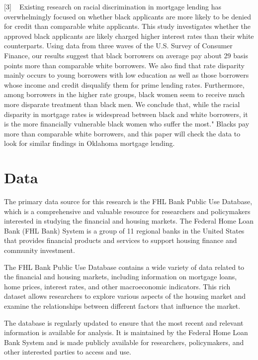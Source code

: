\documentclass[12pt,english]{article}
\begin{document}
[3] ~\cite{Cheng2014RacialDI} Existing research on racial discrimination in mortgage lending has overwhelmingly focused on whether black applicants are more likely to be denied for credit than comparable white applicants. This study investigates whether the approved black applicants are likely charged higher interest rates than their white counterparts. Using data from three waves of the U.S. Survey of Consumer Finance, our results suggest that black borrowers on average pay about 29 basis points more than comparable white borrowers. We also find that rate disparity mainly occurs to young borrowers with low education as well as those borrowers whose income and credit disqualify them for prime lending rates. Furthermore, among borrowers in the higher rate groups, black women seem to receive much more disparate treatment than black men. We conclude that, while the racial disparity in mortgage rates is widespread between black and white borrowers, it is the more financially vulnerable black women who suffer the most." Blacks pay more than comparable white borrowers, and this paper will check the data to look for similar findings in Oklahoma mortgage lending. 

\section{Data}\label{sec:data}
The primary data source for this research is the FHL Bank Public Use Database, which is a comprehensive and valuable resource for researchers and policymakers interested in studying the financial and housing markets. The Federal Home Loan Bank (FHL Bank) System is a group of 11 regional banks in the United States that provides financial products and services to support housing finance and community investment.

The FHL Bank Public Use Database contains a wide variety of data related to the financial and housing markets, including information on mortgage loans, home prices, interest rates, and other macroeconomic indicators. This rich dataset allows researchers to explore various aspects of the housing market and examine the relationships between different factors that influence the market.

The database is regularly updated to ensure that the most recent and relevant information is available for analysis. It is maintained by the Federal Home Loan Bank System and is made publicly available for researchers, policymakers, and other interested parties to access and use.
\end{document}
